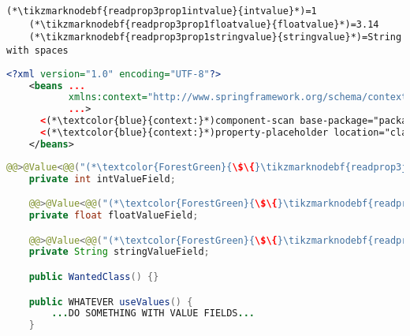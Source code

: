 \newline\example
\begin{lstlisting}[title={A \path{.properties} file called \tikzmarknodebf{readprop3prop1filename}{\textit{annotations.properties}}}]
    (*\tikzmarknodebf{readprop3prop1intvalue}{intvalue}*)=1
    (*\tikzmarknodebf{readprop3prop1floatvalue}{floatvalue}*)=3.14
    (*\tikzmarknodebf{readprop3prop1stringvalue}{stringvalue}*)=String with spaces
\end{lstlisting}
\begin{lstlisting}[language=XML, title={Configuration XML}]
    <?xml version="1.0" encoding="UTF-8"?>
    <beans ...
           xmlns:context="http://www.springframework.org/schema/context"
           ...>
      <(*\textcolor{blue}{context:}*)component-scan base-package="package.subfolder"/>
      <(*\textcolor{blue}{context:}*)property-placeholder location="classpath:(*\tikzmarknodebf{readprop3xml1filename}{annotations.properties}[ForestGreen]*)" file-encoding="utf-8"/>
    </beans>
\end{lstlisting}
\begin{lstlisting}[language=Java, title={Wanted class with the zero--parameter constructor}]
    @@>@Value<@@("(*\textcolor{ForestGreen}{\$\{}\tikzmarknodebf{readprop3java1intvalue}{intvalue}[ForestGreen]\textcolor{ForestGreen}{\}}*)")
    private int intValueField;

    @@>@Value<@@("(*\textcolor{ForestGreen}{\$\{}\tikzmarknodebf{readprop3java1floatvalue}{floatvalue}[ForestGreen]\textcolor{ForestGreen}{\}}*)")
    private float floatValueField;

    @@>@Value<@@("(*\textcolor{ForestGreen}{\$\{}\tikzmarknodebf{readprop3java1stringvalue}{stringvalue}[ForestGreen]\textcolor{ForestGreen}{\}}*)")
    private String stringValueField;

    public WantedClass() {}

    public WHATEVER useValues() {
        ...DO SOMETHING WITH VALUE FIELDS...
    }
\end{lstlisting}
\newpage